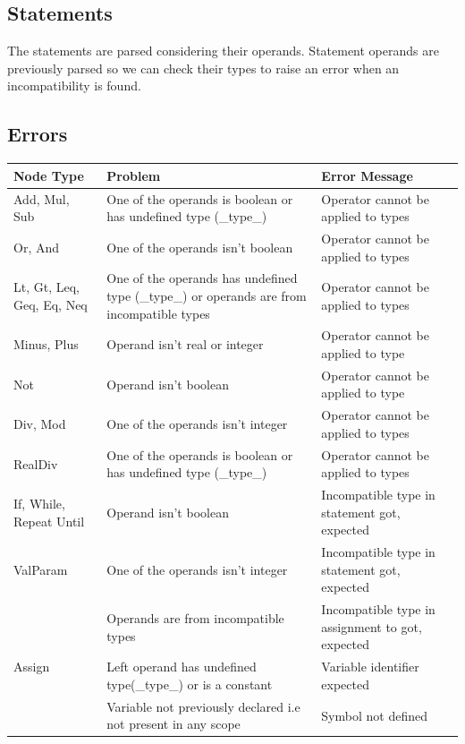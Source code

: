 \documentclass[12pt]{article}
\begin{document}
\subsection{Statements}
The statements are parsed considering their operands. Statement operands are previously parsed so we can check their types to raise an error when an incompatibility is found.

\subsection{Errors}

\begin{longtable} {|p{3.0cm} | p{8cm} | p{4.0cm}|}
\hline 
 \textbf{Node Type} 	& \textbf{Problem} & \textbf{Error Message} \\ \hline
	Add, Mul, Sub 		& One of the operands is boolean or has undefined type (\_type\_) & Operator cannot be applied to types \\ \hline
	Or, And 			& One of the operands isn't boolean & Operator cannot be applied to types \\ \hline
	Lt, Gt, Leq, Geq, Eq, Neq &		One of the operands has undefined type (\_type\_) or operands are from incompatible types & Operator cannot be applied to types \\ \hline
	Minus, Plus 		& Operand isn't real or integer & Operator cannot be applied to type \\ \hline
	Not 				& Operand isn't boolean & Operator cannot be applied to type \\ \hline
	Div, Mod 			& One of the operands isn't integer & Operator cannot be applied to types \\ \hline
	RealDiv				& One of the operands is boolean or has undefined type (\_type\_) & Operator cannot be applied to types \\ \hline
	If, While, Repeat Until & Operand isn't boolean & Incompatible type in statement got, expected \\ \hline
	ValParam 			& One of the operands isn't integer & Incompatible type in statement got, expected \\ \hline
	\multirow{3}{*}{Assign} & Operands are from incompatible types & Incompatible type in assignment to got, expected \\ \cline{2-3}
							& Left operand has undefined type(\_type\_) or is a constant & Variable identifier expected \\ \cline{2-3}
							& Variable not previously declared i.e not present in any scope & Symbol not defined \\ \hline

\end{longtable}
\end{document}
